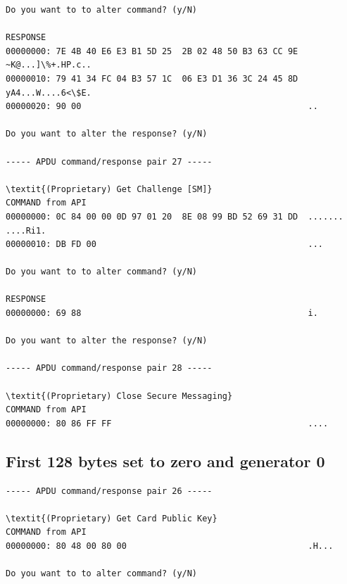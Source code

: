 \documentclass[bsc,frontabs,twoside,singlespacing,parskip,deptreport]{infthesis}     %
\begin{document}
\begin{appendices}
\begin{Verbatim}[commandchars=\\\{\}, fontsize=\small]
Do you want to to alter command? (y/N)

RESPONSE
00000000: 7E 4B 40 E6 E3 B1 5D 25  2B 02 48 50 B3 63 CC 9E  ~K@...]\%+.HP.c..
00000010: 79 41 34 FC 04 B3 57 1C  06 E3 D1 36 3C 24 45 8D  yA4...W....6<\$E.
00000020: 90 00                                             ..

Do you want to alter the response? (y/N)

----- APDU command/response pair 27 -----

\textit{(Proprietary) Get Challenge [SM]}
COMMAND from API
00000000: 0C 84 00 00 0D 97 01 20  8E 08 99 BD 52 69 31 DD  ....... ....Ri1.
00000010: DB FD 00                                          ...

Do you want to to alter command? (y/N)

RESPONSE
00000000: 69 88                                             i.

Do you want to alter the response? (y/N)

----- APDU command/response pair 28 -----

\textit{(Proprietary) Close Secure Messaging}
COMMAND from API
00000000: 80 86 FF FF                                       ....
\end{Verbatim}



\subsection{First 128 bytes set to zero and generator 0}
\begin{Verbatim}[commandchars=\\\{\}, fontsize=\small]
----- APDU command/response pair 26 -----

\textit{(Proprietary) Get Card Public Key}
COMMAND from API
00000000: 80 48 00 80 00                                    .H...

Do you want to to alter command? (y/N)


\end{Verbatim}
\end{appendices}
\end{document}
